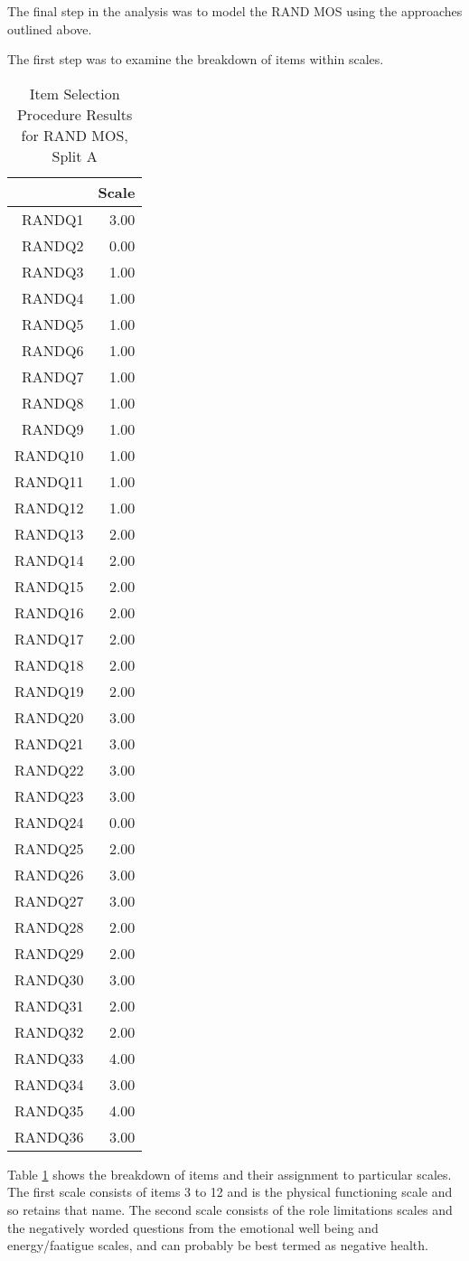 \documentclass{article}
\begin{document}
The final step in the analysis was to model  the RAND MOS using the approaches outlined above. 

The first step was to examine the breakdown of items within scales. 

\begin{table}[ht]
\centering
\begin{tabular}{rr}
  \hline
 & Scale \\ 
  \hline
RANDQ1 & 3.00 \\ 
  RANDQ2 & 0.00 \\ 
  RANDQ3 & 1.00 \\ 
  RANDQ4 & 1.00 \\ 
  RANDQ5 & 1.00 \\ 
  RANDQ6 & 1.00 \\ 
  RANDQ7 & 1.00 \\ 
  RANDQ8 & 1.00 \\ 
  RANDQ9 & 1.00 \\ 
  RANDQ10 & 1.00 \\ 
  RANDQ11 & 1.00 \\ 
  RANDQ12 & 1.00 \\ 
  RANDQ13 & 2.00 \\ 
  RANDQ14 & 2.00 \\ 
  RANDQ15 & 2.00 \\ 
  RANDQ16 & 2.00 \\ 
  RANDQ17 & 2.00 \\ 
  RANDQ18 & 2.00 \\ 
  RANDQ19 & 2.00 \\ 
  RANDQ20 & 3.00 \\ 
  RANDQ21 & 3.00 \\ 
  RANDQ22 & 3.00 \\ 
  RANDQ23 & 3.00 \\ 
  RANDQ24 & 0.00 \\ 
  RANDQ25 & 2.00 \\ 
  RANDQ26 & 3.00 \\ 
  RANDQ27 & 3.00 \\ 
  RANDQ28 & 2.00 \\ 
  RANDQ29 & 2.00 \\ 
  RANDQ30 & 3.00 \\ 
  RANDQ31 & 2.00 \\ 
  RANDQ32 & 2.00 \\ 
  RANDQ33 & 4.00 \\ 
  RANDQ34 & 3.00 \\ 
  RANDQ35 & 4.00 \\ 
  RANDQ36 & 3.00 \\ 
   \hline
\end{tabular}
\caption{Item Selection Procedure Results for RAND MOS, Split A} 
\label{tab:rand2aaisp}
\end{table}
Table \ref{tab:rand2aaisp} shows the breakdown of items and their assignment to particular scales. 
The first scale consists of items 3 to 12 and is the physical functioning scale and so retains that name. 
The second scale consists of the role limitations scales and the negatively worded questions from the emotional well being and energy/faatigue scales, and can probably be best termed as negative health. 
\end{document}
